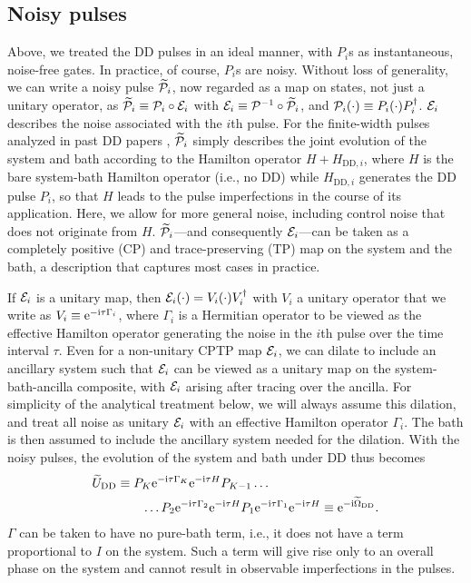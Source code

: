 \documentclass[twocolumn,pra,superscriptaddress]{revtex4-2}
\begin{document}
\subsection{Noisy pulses}
Above, we treated the DD pulses in an ideal manner, with $P_i$s as instantaneous, noise-free gates. In practice, of course, $P_i$s are noisy. Without loss of generality, we can write a noisy pulse $\widetilde{\mathcal{P}}_i$, now regarded as a map on states, not just a unitary operator, as $\widetilde{\mathcal{P}}_i\equiv \mathcal{P}_i\circ\mathcal{E}_i$ with $\mathcal{E}_i\equiv \mathcal{P}^{-1}\circ\widetilde{\mathcal{P}}_i$, and $\mathcal{P}_i(\cdot)\equiv P_i(\cdot)P_i^\dagger$. $\mathcal{E}_i$ describes the noise associated with the $i$th pulse. For the finite-width pulses analyzed in past DD papers , $\widetilde{\mathcal{P}}_i$ simply describes the joint evolution of the system and bath according to the Hamilton operator $H+H_{\mathrm{DD},i}$, where $H$ is the bare system-bath Hamilton operator (i.e., no DD) while $H_{\mathrm{DD},i}$ generates the DD pulse $P_i$, so that $H$ leads to the pulse imperfections in the course of its application. Here, we allow for more general noise, including control noise that does not originate from $H$. $\widetilde{\mathcal{P}}_i$---and consequently $\mathcal{E}_i$---can be taken as a completely positive (CP) and trace-preserving (TP) map on the system and the bath, a description that captures most cases in practice. 

If $\mathcal{E}_i$ is a unitary map, then $\mathcal{E}_i(\cdot)=V_i(\cdot)V_i^\dagger$ with $V_i$ a unitary operator that we write as $V_i\equiv \mathrm{e}^{-\mathrm{i}\tau\Gamma_i}$, where $\Gamma_i$ is a Hermitian operator to be viewed as the effective Hamilton operator generating the noise in the $i$th pulse over the time interval $\tau$. Even for a non-unitary CPTP map $\mathcal{E}_i$, we can dilate to include an ancillary system such that $\mathcal{E}_i$ can be viewed as a unitary map on the system-bath-ancilla composite, with $\mathcal{E}_i$ arising after tracing over the ancilla. For simplicity of the analytical treatment below, we will always assume this dilation, and treat all noise as unitary $\mathcal{E}_i$ with an effective Hamilton operator $\Gamma_i$. The bath is then assumed to include the ancillary system needed for the dilation. With the noisy pulses, the evolution of the system and bath under DD thus becomes
\begin{align}
\widetilde U_\mathrm{DD}&\equiv P_K\mathrm{e}^{-\mathrm{i}\tau\Gamma_K}\mathrm{e}^{-\mathrm{i}\tau H}P_{K-1}\ldots\\
&\qquad\ldots P_2\mathrm{e}^{-\mathrm{i}\tau\Gamma_2}\mathrm{e}^{-\mathrm{i}\tau H}P_1\mathrm{e}^{-\mathrm{i}\tau\Gamma_1}\mathrm{e}^{-\mathrm{i}\tau H}\equiv \mathrm{e}^{-\mathrm{i}\widetilde\Omega_\mathrm{DD}}.\nonumber
\end{align}
$\Gamma$ can be taken to have no pure-bath term, i.e., it does not have a term proportional to $I$ on the system. Such a term will give rise only to an overall phase on the system and cannot result in observable imperfections in the pulses.
\end{document}
